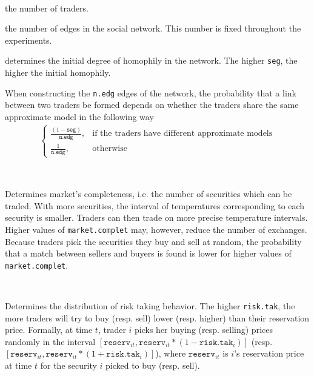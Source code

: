 \documentclass[10pt,a4paper]{article}
\begin{document}
 \begin{description}
 	\setlength\itemsep{0em}
 	\item[Network parameters.]~
 	\begin{description}
 			\setlength\itemsep{0em}
 		\item [\texttt{n.traders}:] the number of traders.
 		\item [\texttt{n.edg} :] the number of edges in the social network. This number is fixed throughout the experiments.   
 		\item [\texttt{seg} :] determines the initial degree of homophily in the network. The higher \texttt{seg}, the higher the initial homophily. 
 		
 		When constructing the \texttt{n.edg} edges of the network, the probability that a link between two traders be formed depends on whether the traders share the same approximate model in the following way
 			\begin{align*}
 			\begin{cases}
 			\frac{(1-\texttt{seg})}{\texttt{n.edg}},  &\text{if the traders have different approximate models}\\
 			\frac{1}{\texttt{n.edg}},  & \text{otherwise}
 			\end{cases}
 			\end{align*}
 	\end{description}
 
 \item[Market structure parameter.]~
 
 		\begin{description}
 			\setlength\itemsep{0em}
 			\item [\texttt{market.complet}.] Determines market's completeness, i.e. the number of securities which can be traded. With more securities, the interval of temperatures corresponding to each security is smaller. Traders can then trade on more precise temperature intervals. Higher values of \texttt{market.complet} may, however, reduce the number of exchanges. Because traders pick the securities they buy and sell at random, the probability that a match between sellers and buyers is found is lower for higher values of \texttt{market.complet}.
 		\end{description}
 	 
 \item[Behavioral parameters.]~
 
 \begin{description}
 	\setlength\itemsep{0em}
 	\item [\texttt{risk.tak}.] Determines the distribution of risk taking behavior. The higher \texttt{risk.tak}, the more traders	will try to buy (resp. sell) lower (resp. higher) than their reservation price. Formally, at time $t$, trader $i$ picks her buying (resp. selling) prices randomly in the interval  $[\texttt{reserv}_{it}, \allowbreak \texttt{reserv}_{it}  * (1 - \texttt{risk.tak}_i)]$ (resp. $[\texttt{reserv}_{it}, \allowbreak \texttt{reserv}_{it} * (1  + \texttt{risk.tak}_i)]$), where $\texttt{reserv}_{it}$ is $i$'s reservation price at time $t$ for the security $i$ picked to buy (resp. sell).
 	

\end{description}
\end{description}
\end{document}
